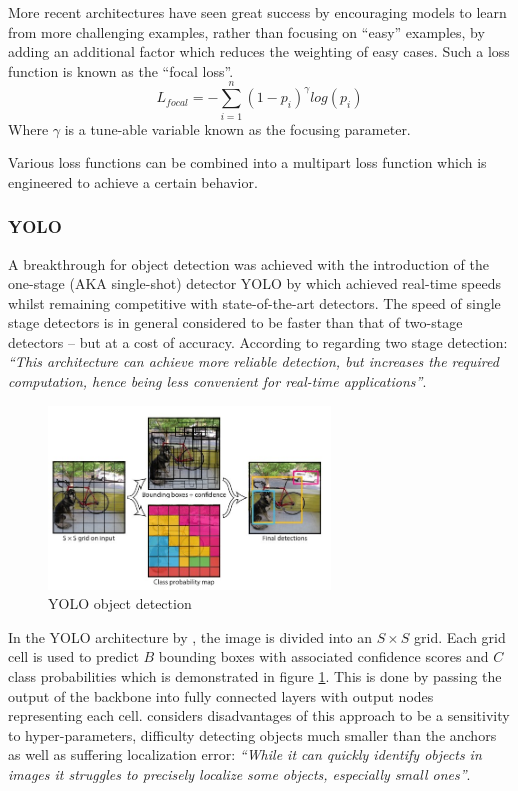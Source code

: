 \documentclass[a4paper,twoside,12pt]{report}
\begin{document}
More recent architectures have seen great success by encouraging models to learn from more challenging examples, rather than focusing on ``easy'' examples, by adding an additional factor which reduces the weighting of easy cases. Such a loss function is known as the ``focal loss''. \citep{focal}
\begin{equation}
L_{focal} = -\sum_{i=1}^{n} (1-p_i)^\gamma log(p_i)
\end{equation} 
Where $\gamma$ is a tune-able variable known as the focusing parameter.

Various loss functions can be combined into a multipart loss function which is engineered to achieve a certain behavior.

\subsubsection{YOLO}

A breakthrough for object detection was achieved with the introduction of the one-stage (AKA single-shot) detector YOLO by \cite{yolo} which achieved real-time speeds whilst remaining competitive with state-of-the-art detectors. The speed of single stage detectors is in general considered to be faster than that of two-stage detectors -- but at a cost of accuracy. According to \cite{stagecomp} regarding two stage detection: \textit{``This architecture can achieve more reliable detection, but increases the required computation, hence being less convenient for real-time applications''}. 

\begin{figure}[h!]
\begin{center}
\includegraphics[width=7.5cm]{images/yolodemo.jpg}
\caption{YOLO object detection \citep{yolo}}
\label{fig:yolodemo}
\end{center}
\end{figure}

In the YOLO architecture by \cite{yolo}, the image is divided into an $S \times S$ grid. Each grid cell is used to predict $B$ bounding boxes with associated confidence scores and $C$ class probabilities which is demonstrated in figure \ref{fig:yolodemo}. This is done by passing the output of the backbone into fully connected layers with output nodes representing each cell. \cite{yolo} considers disadvantages of this approach to be a sensitivity to hyper-parameters, difficulty detecting objects much smaller than the anchors as well as suffering localization error: \textit{``While it can quickly identify objects in images it struggles to precisely localize some objects, especially small ones''}. 
\end{document}
